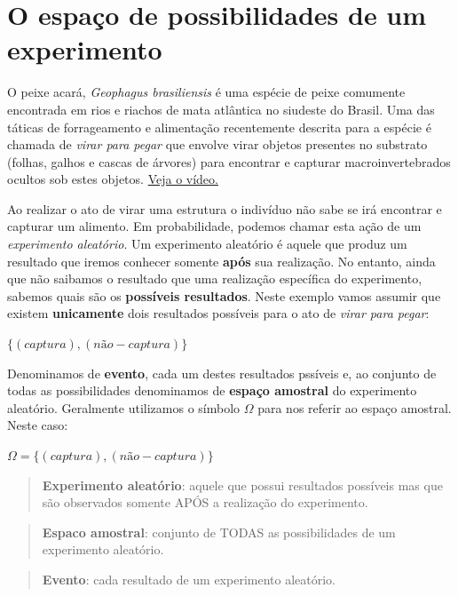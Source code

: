 \documentclass[
]{book}
\begin{document}
\hypertarget{espacoamostral}{%
\chapter{O espaço de possibilidades de um experimento}\label{espacoamostral}}

O peixe acará, \emph{Geophagus brasiliensis} é uma espécie de peixe comumente encontrada em rios e riachos de mata atlântica no siudeste do Brasil. Uma das táticas de forrageamento e alimentação recentemente descrita para a espécie é chamada de \emph{virar para pegar} \citep{souza2019surprising} que envolve virar objetos presentes no substrato (folhas, galhos e cascas de árvores) para encontrar e capturar macroinvertebrados ocultos sob estes objetos. \href{https://www.scielo.br/img/revistas/bn/v19n3/1676-0611-bn-19-03-e20180702-suppl1.mp4}{Veja o vídeo.}

Ao realizar o ato de virar uma estrutura o indivíduo não sabe se irá encontrar e capturar um alimento. Em probabilidade, podemos chamar esta ação de um \emph{experimento aleatório}. Um experimento aleatório é aquele que produz um resultado que iremos conhecer somente \textbf{após} sua realização. No entanto, ainda que não saibamos o resultado que uma realização específica do experimento, sabemos quais são os \textbf{possíveis resultados}. Neste exemplo vamos assumir que existem \textbf{unicamente} dois resultados possíveis para o ato de \emph{virar para pegar}:

\(\{(captura), (não-captura)\}\)

Denominamos de \textbf{evento}, cada um destes resultados pssíveis e, ao conjunto de todas as possibilidades denominamos de \textbf{espaço amostral} do experimento aleatório. Geralmente utilizamos o símbolo \(\Omega\) para nos referir ao espaço amostral. Neste caso:

\(\Omega = \{(captura), (não-captura)\}\)

\begin{quote}
\textbf{Experimento aleatório}: aquele que possui resultados possíveis mas que são observados somente APÓS a realização do experimento.
\end{quote}

\begin{quote}
\textbf{Espaco amostral}: conjunto de TODAS as possibilidades de um experimento aleatório.
\end{quote}

\begin{quote}
\textbf{Evento}: cada resultado de um experimento aleatório.
\end{quote}
\end{document}
